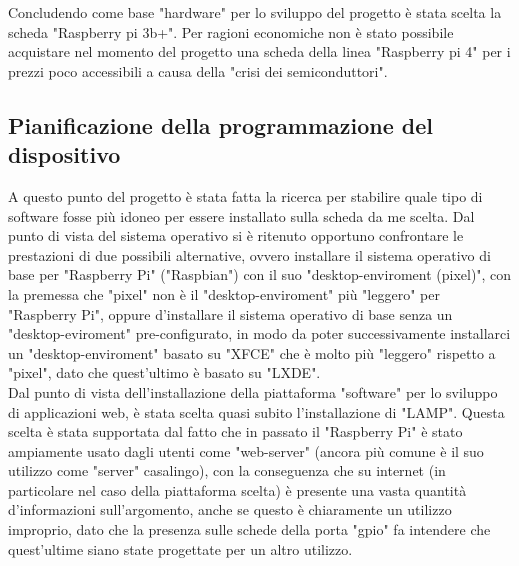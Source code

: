 Concludendo come base "hardware" per lo sviluppo del progetto è stata scelta la scheda "Raspberry pi 3b+". Per ragioni economiche non è stato possibile acquistare nel momento del progetto una scheda della linea "Raspberry pi 4" per i prezzi poco accessibili a causa della "crisi dei semiconduttori".

\subsection{Pianificazione della programmazione del dispositivo}
A questo punto del progetto è stata fatta la ricerca per stabilire quale tipo di software fosse più idoneo per essere installato sulla scheda da me scelta. Dal punto di vista del sistema operativo si è ritenuto opportuno confrontare le prestazioni di due possibili alternative, ovvero installare il sistema operativo di base per "Raspberry Pi" ("Raspbian") con il suo "desktop-enviroment (pixel)", con la premessa che "pixel" non è il "desktop-enviroment" più "leggero" per "Raspberry Pi", oppure d'installare il sistema operativo di base senza un "desktop-eviroment" pre-configurato, in modo da poter successivamente installarci un "desktop-enviroment" basato su "XFCE" che è molto più "leggero" rispetto a "pixel", dato che quest'ultimo è basato su "LXDE".\\
Dal punto di vista dell'installazione della piattaforma "software" per lo sviluppo di applicazioni web, è stata scelta quasi subito l'installazione di "LAMP". Questa scelta è stata supportata dal fatto che in passato il "Raspberry Pi" è stato ampiamente usato dagli utenti come "web-server" (ancora più comune è il suo utilizzo come "server" casalingo), con la conseguenza che su internet (in particolare nel caso della piattaforma scelta) è presente una vasta quantità d'informazioni sull'argomento,  anche se questo è chiaramente un utilizzo improprio, dato che la presenza sulle schede della porta "gpio" fa intendere che quest'ultime siano state progettate per un altro utilizzo. 

